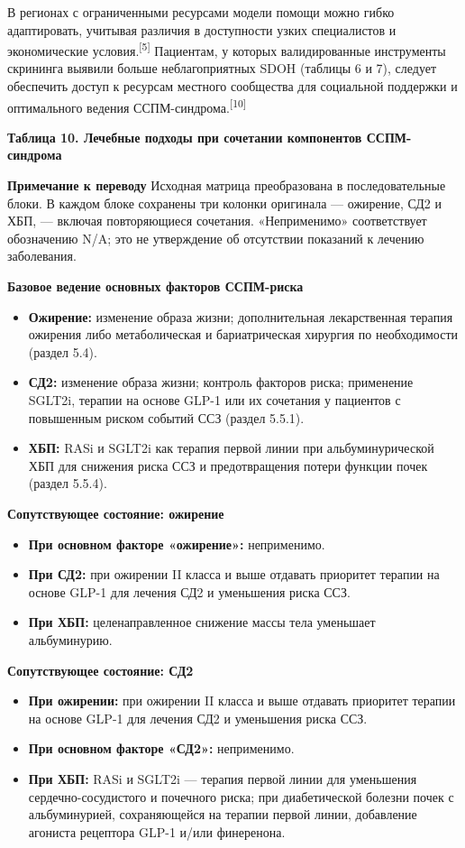 \documentclass[11pt,a4paper]{article}
\newcommand{\src}[1]{\textsuperscript{[#1]}}
\newcommand{\editorial}[1]{\par\begingroup\small\color{black!70}\textbf{Примечание к переводу} #1\par\endgroup}
\newcommand{\heading}[1]{\par\medskip\textbf{#1}\par}
\begin{document}
В регионах с ограниченными ресурсами модели помощи можно гибко адаптировать, учитывая различия в доступности узких специалистов и экономические условия.\src{5} Пациентам, у которых валидированные инструменты скрининга выявили больше неблагоприятных SDOH (таблицы 6 и 7), следует обеспечить доступ к ресурсам местного сообщества для социальной поддержки и оптимального ведения ССПМ-синдрома.\src{10}

\heading{Таблица 10. Лечебные подходы при сочетании компонентов ССПМ-синдрома}
\editorial{Исходная матрица преобразована в последовательные блоки. В каждом блоке сохранены три колонки оригинала --- ожирение, СД2 и ХБП, --- включая повторяющиеся сочетания. «Неприменимо» соответствует обозначению N/A; это не утверждение об отсутствии показаний к лечению заболевания.}

\heading{Базовое ведение основных факторов ССПМ-риска}
\begin{itemize}
\item \textbf{Ожирение:} изменение образа жизни; дополнительная лекарственная терапия ожирения либо метаболическая и бариатрическая хирургия по необходимости (раздел 5.4).
\item \textbf{СД2:} изменение образа жизни; контроль факторов риска; применение SGLT2i, терапии на основе GLP-1 или их сочетания у пациентов с повышенным риском событий ССЗ (раздел 5.5.1).
\item \textbf{ХБП:} RASi и SGLT2i как терапия первой линии при альбуминурической ХБП для снижения риска ССЗ и предотвращения потери функции почек (раздел 5.5.4).
\end{itemize}

\heading{Сопутствующее состояние: ожирение}
\begin{itemize}
\item \textbf{При основном факторе «ожирение»:} неприменимо.
\item \textbf{При СД2:} при ожирении II класса и выше отдавать приоритет терапии на основе GLP-1 для лечения СД2 и уменьшения риска ССЗ.
\item \textbf{При ХБП:} целенаправленное снижение массы тела уменьшает альбуминурию.
\end{itemize}

\heading{Сопутствующее состояние: СД2}
\begin{itemize}
\item \textbf{При ожирении:} при ожирении II класса и выше отдавать приоритет терапии на основе GLP-1 для лечения СД2 и уменьшения риска ССЗ.
\item \textbf{При основном факторе «СД2»:} неприменимо.
\item \textbf{При ХБП:} RASi и SGLT2i --- терапия первой линии для уменьшения сердечно-сосудистого и почечного риска; при диабетической болезни почек с альбуминурией, сохраняющейся на терапии первой линии, добавление агониста рецептора GLP-1 и/или финеренона.
\end{itemize}
\end{document}
